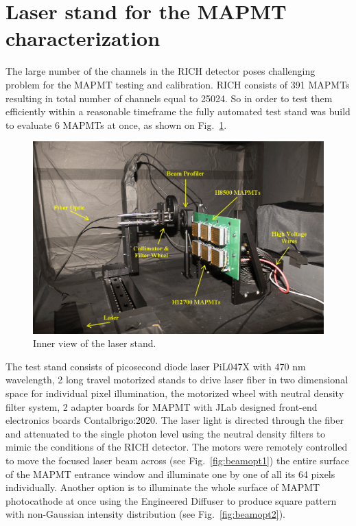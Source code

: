 
\section{Laser stand for the MAPMT characterization}
The large number of the channels in the RICH detector  poses challenging problem for the MAPMT testing and calibration.
RICH consists of 391 MAPMTs resulting in total number of channels equal to 25024. So in order to test them efficiently within a reasonable timeframe the fully automated test stand was build to evaluate 6 MAPMTs at once, as shown on Fig.~\ref{fig:MAPMTtest}.

\begin{figure}[hbt]
	\centering
	\includegraphics[width=0.9\linewidth]{figures/blackbox.png}
	\caption{Inner view of the laser stand.}
	\label{fig:MAPMTtest}
\end{figure}

The test stand consists of picosecond diode  laser PiL047X with 470 nm wavelength, 2 long travel motorized stands to drive laser fiber in two dimensional space for individual pixel illumination, the motorized wheel with neutral density filter system, 2 adapter boards for MAPMT with JLab designed front-end electronics boards \cite{}{Contalbrigo:2020}.
The laser light is directed through the fiber and attenuated to the single photon level using the neutral density filters to mimic the conditions of the RICH detector.
The motors were remotely controlled to move the focused laser beam across (see Fig.~\ref{fig:beamopt1}) the entire surface of the MAPMT entrance window and illuminate one by one of all its 64 pixels individually.
Another option is to illuminate the whole surface of MAPMT photocathode at once using the Engineered Diffuser to produce square pattern with non-Gaussian intensity distribution (see Fig.~\ref{fig:beamopt2}). 

